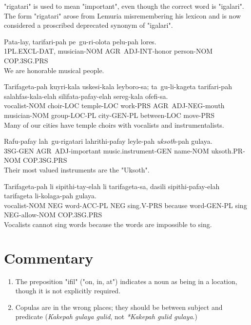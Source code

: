 \documentclass{thiguka}
\begin{document}
"rigatari" is used to mean "important", even though the correct word is "igalari". The form "rigatari" arose from Lemuria misremembering his lexicon and is now considered a proscribed deprecated synonym of "igalari".

\begin{exe}
    \ex{} \gll{}Pata-lay, tarifari-pah pe~gu-ri-olota pelu-pah lores.\\
                1PL.EXCL-DAT, musician-NOM AGR~ADJ-INT-honor person-NOM COP.3SG.PRS\\
          \glt{}We are honorable musical people.
\end{exe}

\begin{exe}
    \ex{} \gll{}Tarifageta-pah kuyri-kala uskesi-kala leyboro-sa; ta~gu-li-kageta tarifari-pah salahfas-kala-elah silifata-pafay-elah sereg-kala ofefi-sa.\\
                vocalist-NOM choir-LOC temple-LOC work-PRS AGR~ADJ-NEG-mouth musician-NOM group-LOC-PL city-GEN-PL between-LOC move-PRS\\
          \glt{}Many of our cities have temple choirs with vocalists and instrumentalists.
\end{exe}

\begin{exe}
    \ex{} \gll{}Rafu-pafay lah~gu-rigatari lahrithi-pafay leyle-pah \textit{uksoth}-pah gulaya.\\
                3SG-GEN AGR~ADJ-important music.instrument-GEN name-NOM uksoth.PR-NOM COP.3SG.PRS\\
          \glt{}Their most valued instruments are the "Uksoth".
\end{exe}

\begin{exe}
    \ex{} \gll{}Tarifageta-pah li sipithi-tay-elah li tarifageta-sa, dasili sipithi-pafay-elah tarifageta li-kolaga-pah gulaya.\\
                vocalist-NOM NEG word-ACC-PL NEG sing.V-PRS because word-GEN-PL sing NEG-allow-NOM COP.3SG.PRS\\
          \glt{}Vocalists cannot sing words because the words are impossible to sing.
\end{exe}

\newpage

\section{Commentary}
\begin{enumerate}
    \item The preposition "ifil" ("on, in, at") indicates a noun as being in a location, though it is not explicitly required.
    \item Copulas are in the wrong places; they should be between subject and predicate (\textit{Kakepah gulaya gulid}, not \textit{*Kakepah gulid gulaya}.)
\end{enumerate}
\end{document}
